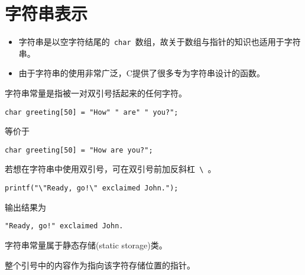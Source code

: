 \section{字符串表示}

\begin{frame}[fragile]\ft{\secname}
\begin{itemize}
\item
字符串是以空字符结尾的\lstinline| char |数组，故关于数组与指针的知识也适用于字符串。
\\[0.15in]
\item
由于字符串的使用非常广泛，C提供了很多专为字符串设计的函数。
\end{itemize}
\end{frame}

\begin{frame}[fragile]

字符串常量是指被一对双引号括起来的任何字符。\vspace{0.1in}

\begin{lstlisting}[basicstyle=\ttfamily,showstringspaces=true]
char greeting[50] = "How" " are" " you?";
\end{lstlisting}
等价于
\begin{lstlisting}[basicstyle=\ttfamily,showstringspaces=true]
char greeting[50] = "How are you?";
\end{lstlisting}
\end{frame}

\begin{frame}[fragile]
若想在字符串中使用双引号，可在双引号前加反斜杠\lstinline| \ |。\vspace{0.1in}

\begin{lstlisting}[basicstyle=\ttfamily,showstringspaces=true]
printf("\"Ready, go!\" exclaimed John.");
\end{lstlisting}\vspace{0.1in}

输出结果为
\begin{lstlisting}[basicstyle=\ttfamily,showstringspaces=true]
"Ready, go!" exclaimed John.
\end{lstlisting}
\end{frame}

\begin{frame}[fragile]
字符串常量属于静态存储(static storage)类。\vspace{0.1in}

\vspace{0.1in}

整个引号中的内容作为指向该字符存储位置的指针。
\end{frame}

